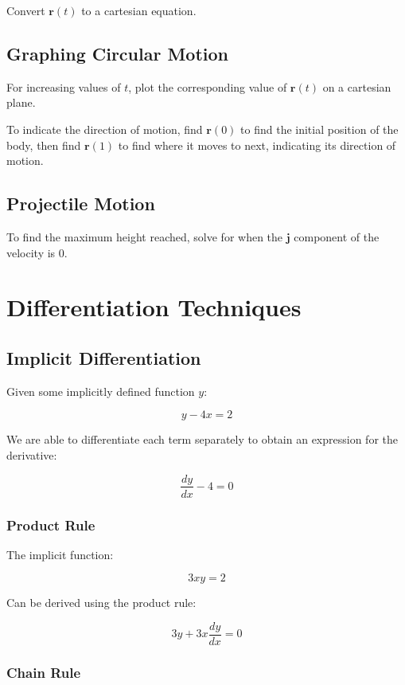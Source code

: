 \documentclass[a4paper,11pt]{report}
\newcommand{\bb}{\boldsymbol}
\begin{document}
Convert $\bb{r}(t)$ to a cartesian equation.

\subsection{Graphing Circular Motion}

For increasing values of $t$, plot the corresponding value of $\bb{r}(t)$ on a
cartesian plane.

To indicate the direction of motion, find $\bb{r}(0)$ to find the initial
position of the body, then find $\bb{r}(1)$ to find where it moves to next,
indicating its direction of motion.

\subsection{Projectile Motion}

To find the maximum height reached, solve for when the $\bb{j}$ component of
the velocity is 0.


\section{Differentiation Techniques}

\subsection{Implicit Differentiation}

Given some implicitly defined function $y$:

$$
y - 4x = 2
$$

We are able to differentiate each term separately to obtain an expression for
the derivative:

$$
\frac{dy}{dx} - 4 = 0
$$

\subsubsection{Product Rule}

The implicit function:

$$
3xy = 2
$$

Can be derived using the product rule:

$$
3y + 3x \frac{dy}{dx} = 0
$$

\subsubsection{Chain Rule}
\end{document}
